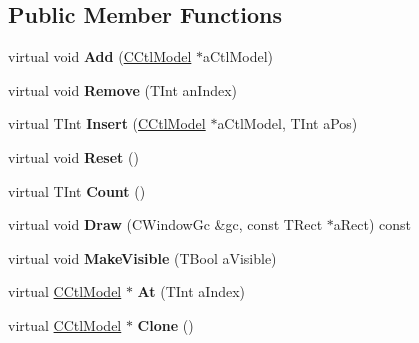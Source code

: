 \subsection*{Public Member Functions}
\begin{DoxyCompactItemize}
\item 
\mbox{\label{classCCtlRow_a6ca919a0199728ecc074bc1535e66d21}} 
virtual void {\bfseries Add} (\hyperlink{classCCtlModel}{C\+Ctl\+Model} $\ast$a\+Ctl\+Model)
\item 
\mbox{\label{classCCtlRow_ae8321a5204f1ccd60adf17b955ff9655}} 
virtual void {\bfseries Remove} (T\+Int an\+Index)
\item 
\mbox{\label{classCCtlRow_a20d7f8cc1a807a0007c518fcc64601a4}} 
virtual T\+Int {\bfseries Insert} (\hyperlink{classCCtlModel}{C\+Ctl\+Model} $\ast$a\+Ctl\+Model, T\+Int a\+Pos)
\item 
\mbox{\label{classCCtlRow_a4c73c3acc51e3a77307f5dfed79b097d}} 
virtual void {\bfseries Reset} ()
\item 
\mbox{\label{classCCtlRow_a1787fe65c0cd77a6644a7d5a4a9b3eb3}} 
virtual T\+Int {\bfseries Count} ()
\item 
\mbox{\label{classCCtlRow_a7f550d876fe41f3f0cf0e11c9fe8cd9d}} 
virtual void {\bfseries Draw} (C\+Window\+Gc \&gc, const T\+Rect $\ast$a\+Rect) const
\item 
\mbox{\label{classCCtlRow_a254b1246d84231b15fddd19a0d265dc9}} 
virtual void {\bfseries Make\+Visible} (T\+Bool a\+Visible)
\item 
\mbox{\label{classCCtlRow_a26a84421ba99cb16e657ca67628201fc}} 
virtual \hyperlink{classCCtlModel}{C\+Ctl\+Model} $\ast$ {\bfseries At} (T\+Int a\+Index)
\item 
\mbox{\label{classCCtlRow_aa072887b40bc71bc218686df92e04c20}} 
virtual \hyperlink{classCCtlModel}{C\+Ctl\+Model} $\ast$ {\bfseries Clone} ()
\item 
\mbox{\label{classCCtlRow_ab7d8b6ee27f84d0e074e93f47386a7aa}} 

\end{DoxyCompactItemize}
